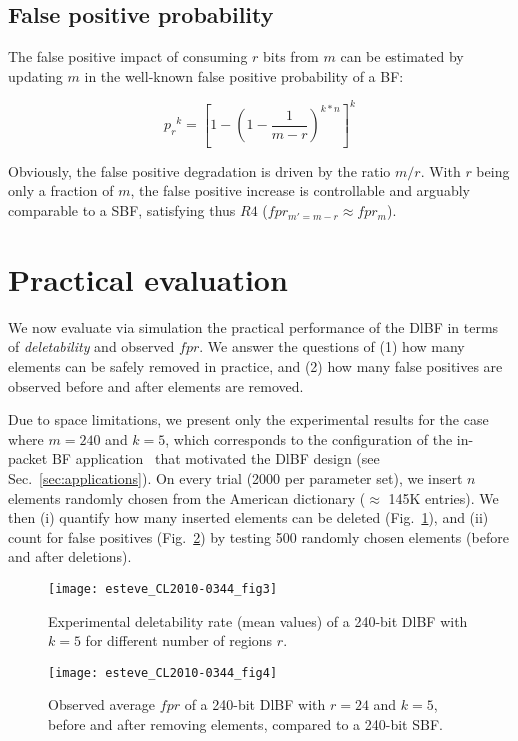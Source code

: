 \documentclass[conference]{IEEEtran}
\begin{document}
\subsection{False positive probability}

The false positive impact of consuming $r$ bits from $m$ can be estimated by updating $m$ in the well-known false positive probability of a BF: 





\begin{footnotesize}
\begin{equation}
  {p_r}^k = \left[1 - \left(1 - \frac{1}{m-r}\right)^{k*n}\right]^k \label{eq:Pdlbf}
\end{equation}
\end{footnotesize}
Obviously, the false positive degradation is driven by the ratio $m/ r$.  
With  $r$ being only a fraction of $m$, the false positive increase is controllable and arguably comparable to a SBF, satisfying thus $R4$ ($fpr_{m'=m-r} \approx fpr_{m}$).






\section{Practical evaluation}
\label{sec:evaluation}

We now evaluate via simulation the practical performance of the DlBF in terms of \textit{deletability} and observed $fpr$. 
We answer the questions of (1) how many elements can be safely removed in practice, and (2) how many false positives are observed before and after elements are removed. 

Due to space limitations, we present only the experimental results for the case where $m = 240$ and $k=5$, which corresponds to the configuration of the in-packet BF application~\cite{lipsin} that motivated the DlBF design (see Sec.~\ref{sec:applications}). On every trial (2000 per parameter set), we insert $n$ elements randomly chosen from the American dictionary ($\approx$ 145K entries). We then (i) quantify how many inserted elements can be deleted (Fig.~\ref{fig:bfd-exp}), and (ii) count for false positives (Fig.~\ref{fig:fpr-exp}) by testing 500 randomly chosen elements (before and after deletions).
\begin{figure}[t]
\centering
\texttt{[image: esteve\_CL2010-0344\_fig3]} 
\caption{Experimental deletability rate (mean values) of a 240-bit DlBF with $k=5$ for different number of regions $r$.}
\label{fig:bfd-exp}
\end{figure}
\begin{figure}[t]
\centering
\texttt{[image: esteve\_CL2010-0344\_fig4]} 
\caption{Observed average $fpr$ of a 240-bit DlBF with $r=24$ and $k=5$, before and after removing elements, compared to a 240-bit SBF.}
\label{fig:fpr-exp}
\end{figure}
\end{document}
